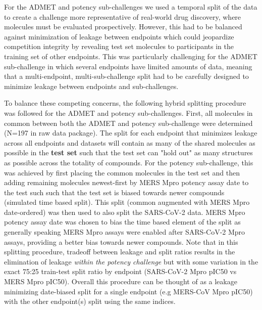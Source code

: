 \documentclass[journal=jcim,manuscript=article]{achemso}
\begin{document}
For the ADMET and potency sub-challenges we used a temporal split of the data to create a challenge more representative of real-world drug discovery, where molecules must be evaluated prospectively\cite{sheridan_time-split_2013}. However, this had to be balanced against minimization of leakage between endpoints which could jeopardize competition integrity by revealing test set molecules to participants in the training set of other endpoints. This was particularly challenging for the ADMET sub-challenge in which several endpoints have limited amounts of data, meaning that a multi-endpoint, multi-sub-challenge split had to be carefully designed to minimize leakage between endpoints and sub-challenges. 

To balance these competing concerns, the following hybrid splitting procedure was followed for the ADMET and potency sub-challenges. First, all molecules in common between both the ADMET and potency sub-challenge were determined (N=197 in raw data package). The split for each endpoint that minimizes leakage across all endpoints and datasets will contain as many of the shared molecules as possible in the \textbf{test set} such that the test set can "hold out" as many structures as possible across the totality of compounds. For the potency sub-challenge, this was achieved by first placing the common molecules in the test set and then adding remaining molecules newest-first by MERS Mpro potency assay date to the test such such that the test set is biased towards newer compounds (simulated time based split). This split (common augmented with MERS Mpro date-ordered) was then used to also split the SARS-CoV-2 data.   MERS Mpro potency assay date was chosen to bias the time based element of the split as generally speaking MERS Mpro assays were enabled after SARS-CoV-2 Mpro assays, providing a better bias towards newer compounds. Note that in this splitting procedure, tradeoff between leakage and split ratios results in the elimination of leakage \textit{within the potency challenge} but with some variation in the exact 75:25 train-test split ratio by endpoint (SARS-CoV-2 Mpro pIC50 vs MERS Mpro pIC50). Overall this procedure can be thought of as a leakage minimizing date-biased split for a single endpoint (e.g MERS-CoV Mpro pIC50) with the other endpoint(s) split using the same indices.
\end{document}
